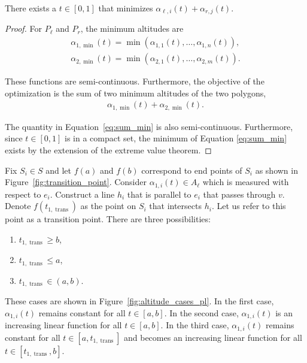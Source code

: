 \documentclass[../main.tex]{subfiles}
\begin{document}
\begin{lemma}
There exists a $t\in[0,1]$ that minimizes $\alpha_{\ell,i}(t)+\alpha_{r,j}(t)$.
\end{lemma}
\begin{proof}
For $P_{\ell}$ and $P_r$, the minimum altitudes are
\begin{equation}
\begin{aligned}
\alpha_{1,\min}(t)=\min(\alpha_{1,1}(t),\ldots,\alpha_{1,n}(t)),\\
\alpha_{2,\min}(t)=\min(\alpha_{2,1}(t),\ldots,\alpha_{2,m}(t)).
\end{aligned}
\end{equation}


These functions are semi-continuous. Furthermore, the objective of the optimization is the sum of two minimum altitudes of the two polygons,
\begin{equation}
\begin{aligned}
\label{eq:sum_min}
\alpha_{1,\min}(t)+\alpha_{2,\min}(t).
\end{aligned}
\end{equation}

The quantity in Equation~\ref{eq:sum_min} is also semi-continuous. Furthermore, since $t\in[0,1]$ is in a compact set, the minimum of Equation \ref{eq:sum_min} exists by the extension of the extreme value theorem.
\end{proof}

Fix $S_i\in S$ and let $f(a)$ and $f(b)$ correspond to end points of $S_i$ as shown in Figure~\ref{fig:transition_point}. Consider $\alpha_{1,i}(t)\in A_{\ell}$ which is measured with respect to $e_i$. Construct a line $h_{i}$ that is parallel to $e_i$ that passes through $v$. Denote $f(t_{1,\operatorname{trans}})$ as the point on $S_i$ that intersects $h_i$. Let us refer to this point as a transition point. There are three possibilities:
\begin{enumerate}
	\item $t_{1,\operatorname{trans}}\geq b$,
	\item $t_{1,\operatorname{trans}}\leq a$,
	\item $t_{1,\operatorname{trans}}\in(a,b)$.
\end{enumerate} 
These cases are shown in Figure~\ref{fig:altitude_cases_pl}. In the first case, $\alpha_{1,i}(t)$ remains constant for all $t\in[a,b]$. In the second case, $\alpha_{1,i}(t)$ is an increasing linear function for all $t\in[a,b]$. In the third case, $\alpha_{1,i}(t)$ remains constant for all $t\in[a,t_{1,\operatorname{trans}}]$ and becomes an increasing linear function for all $t\in[t_{1,\operatorname{trans}},b]$.
\end{document}

